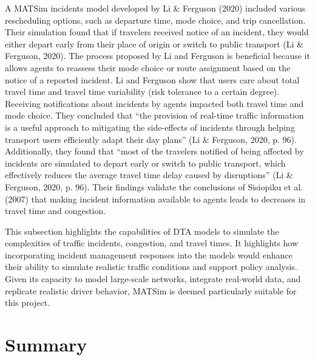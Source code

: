 \documentclass[fancy, oneside, mastersfancy, ms]{byuthesis}
\begin{document}
A MATSim incidents model developed by Li \& Ferguson (2020) included
various rescheduling options, such as departure time, mode choice, and
trip cancellation. Their simulation found that if travelers received
notice of an incident, they would either depart early from their place
of origin or switch to public transport (Li \& Ferguson, 2020). The
process proposed by Li and Ferguson is beneficial because it allows
agents to reassess their mode choice or route assignment based on the
notice of a reported incident. Li and Ferguson show that users care
about total travel time and travel time variability (risk tolerance to a
certain degree). Receiving notifications about incidents by agents
impacted both travel time and mode choice. They concluded that ``the
provision of real-time traffic information is a useful approach to
mitigating the side-effects of incidents through helping transport users
efficiently adapt their day plans'' (Li \& Ferguson, 2020, p. 96).
Additionally, they found that ``most of the travelers notified of being
affected by incidents are simulated to depart early or switch to public
transport, which effectively reduces the average travel time delay
caused by disruptions'' (Li \& Ferguson, 2020, p. 96). Their findings
validate the conclusions of Sisiopiku et al. (2007) that making incident
information available to agents leads to decreases in travel time and
congestion.

This subsection highlights the capabilities of DTA models to simulate
the complexities of traffic incidents, congestion, and travel times. It
highlights how incorporating incident management responses into the
models would enhance their ability to simulate realistic traffic
conditions and support policy analysis. Given its capacity to model
large-scale networks, integrate real-world data, and replicate realistic
driver behavior, MATSim is deemed particularly suitable for this
project.

\hypertarget{sec-lit_summary}{%
\section{Summary}\label{sec-lit_summary}}
\end{document}
